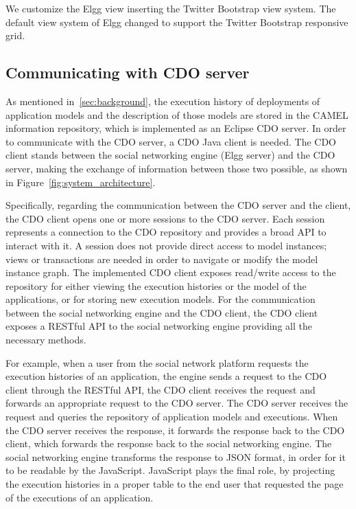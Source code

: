 We customize the Elgg view inserting the Twitter Bootstrap view system. The default view system of Elgg changed to support the Twitter Bootstrap responsive grid.

\subsection{Communicating with CDO server}
\label{sec:cdo_comm}
As mentioned in~\ref{sec:background}, the execution history of deployments of application models and the description of those models are stored in the CAMEL information repository, which is implemented as an Eclipse CDO server. In order to communicate with the CDO server, a CDO Java client is needed. The CDO client stands between the social networking engine (Elgg server) and the CDO server, making the exchange of information between those two possible, as shown in Figure~\ref{fig:system_architecture}.

Specifically, regarding the communication between the CDO server and the client, the CDO client opens one or more sessions to the CDO server. Each session represents a connection to the CDO repository and provides a broad API to interact with it. A session does not provide direct access to model instances; views or transactions are needed in order to navigate or modify the model instance graph. The implemented CDO client exposes read/write access to the repository for either viewing the execution histories or the model of the applications, or for storing new execution models. For the communication between the social networking engine and the CDO client, the CDO client exposes a RESTful API to the social networking engine providing all the necessary methods. 

For example, when a user from the social network platform requests the execution histories of an application, the engine sends a request to the CDO client through the RESTful API, the CDO client receives the request and forwards an appropriate request to the CDO server. The CDO server receives the request and queries the repository of application models and executions. When the CDO server receives the response, it forwards the response back to the CDO client, which forwards the response back to the social networking engine. The social networking engine transforms the response to JSON format, in order for it to be readable by the JavaScript. JavaScript plays the final role, by projecting the execution histories in a proper table to the end user that requested the page of the executions of an application.


